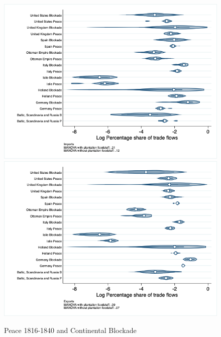 \documentclass[12pt,a4paper,notitlepage,english]{article}
\begin{document}
\begin{appendix}
\begin{figure}[h!]
\centering
\caption{Peace 1816-1840 and Continental Blockade}
\label{peace1816_1840_block_nat_distr_pays7}
\includegraphics[scale=.4]{peace1816_1840_block_nat_distr_Ipays7}
\includegraphics[scale=.4]{peace1816_1840_block_nat_distr_Xpays7}
\end{figure}


\end{appendix}
\end{document}
